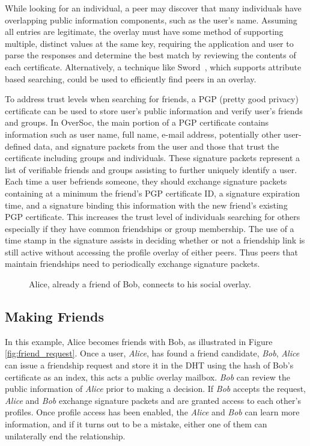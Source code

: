 While looking for an individual, a peer may discover that many individuals have
overlapping public information components, such as the user's name.  Assuming
all entries are legitimate, the overlay must have some method of supporting
multiple, distinct values at the same key, requiring the application and user
to parse the responses and determine the best match by reviewing the contents
of each certificate.  Alternatively, a technique like Sword~\cite{sword}, which
supports attribute based searching, could be used to efficiently find peers in
an overlay.

To address trust levels when searching for friends, a PGP (pretty good privacy)
certificate can be used to store user's public information and verify user's
friends and groups.  In OverSoc, the main portion of a PGP certificate contains
information such as user name, full name, e-mail address, potentially other
user-defined data, and signature packets from the user and those that trust the
certificate including groups and individuals.  These signature packets
represent a list of verifiable friends and groups assisting to further uniquely
identify a user.  Each time a user befriends someone, they should exchange
signature packets containing at a minimum the friend's PGP certificate ID, a
signature expiration time, and a signature binding this information with the
new friend's existing PGP certificate.  This increases the trust level of
individuals searching for others especially if they have common friendships or
group membership.  The use of a time stamp in the signature assists in deciding
whether or not a friendship link is still active without accessing the profile
overlay of either peers.  Thus peers that maintain friendships need to
periodically exchange signature packets.

\begin{figure}
\centering
{}
\caption{Alice, already a friend of Bob, connects to his social overlay.}
\label{fig:friendship_join}
\end{figure}

\subsection{Making Friends}

In this example, Alice becomes friends with Bob, as illustrated in Figure
\ref{fig:friend_request}.  Once a user, \textit{Alice}, has found a friend
candidate, \textit{Bob}, \textit{Alice} can issue a friendship request and
store it in the DHT using the hash of Bob's certificate as an index, this acts
a public overlay mailbox.  \textit{Bob} can review the public information of
\textit{Alice} prior to making a decision.  If \textit{Bob} accepts the
request, \textit{Alice} and \textit{Bob} exchange signature packets and are
granted access to each other's profiles.  Once profile access has been enabled,
the \textit{Alice} and \textit{Bob} can learn more information, and if it turns
out to be a mistake, either one of them can unilaterally end the relationship.

